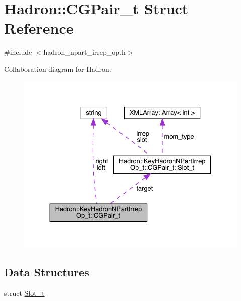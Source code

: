 \hypertarget{structHadron_1_1KeyHadronNPartIrrepOp__t_1_1CGPair__t}{}\section{Hadron\+:\+:C\+G\+Pair\+\_\+t Struct Reference}
\label{structHadron_1_1KeyHadronNPartIrrepOp__t_1_1CGPair__t}


{\ttfamily \#include $<$hadron\+\_\+npart\+\_\+irrep\+\_\+op.\+h$>$}



Collaboration diagram for Hadron\+:\nopagebreak
\begin{figure}[H]
\begin{center}
\leavevmode
\includegraphics[width=330pt]{d6/d25/structHadron_1_1KeyHadronNPartIrrepOp__t_1_1CGPair__t__coll__graph}
\end{center}
\end{figure}
\subsection*{Data Structures}
\begin{DoxyCompactItemize}
\item 
struct \mbox{\hyperlink{structHadron_1_1KeyHadronNPartIrrepOp__t_1_1CGPair__t_1_1Slot__t}{Slot\+\_\+t}}
\end{DoxyCompactItemize}
